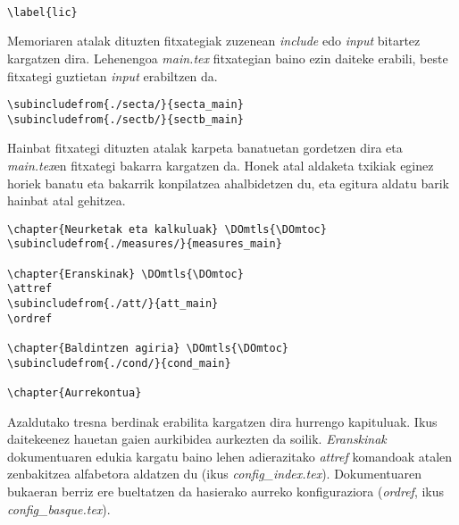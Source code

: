 \begin{verbatim}

\label{lic}

\end{verbatim}

Memoriaren atalak dituzten fitxategiak zuzenean \emph{include} edo \emph{input} bitartez kargatzen dira. Lehenengoa \emph{main.tex} fitxategian baino ezin daiteke erabili, beste fitxategi guztietan \emph{input} erabiltzen da.

\begin{verbatim}
\subincludefrom{./secta/}{secta_main}
\subincludefrom{./sectb/}{sectb_main}
\end{verbatim}

Hainbat fitxategi dituzten atalak karpeta banatuetan gordetzen dira eta \emph{main.tex}en fitxategi bakarra kargatzen da. Honek atal aldaketa txikiak eginez horiek banatu eta bakarrik konpilatzea ahalbidetzen du, eta egitura aldatu barik hainbat atal gehitzea.

\begin{verbatim}
\chapter{Neurketak eta kalkuluak} \DOmtls{\DOmtoc}
\subincludefrom{./measures/}{measures_main}

\chapter{Eranskinak} \DOmtls{\DOmtoc}
\attref
\subincludefrom{./att/}{att_main}
\ordref

\chapter{Baldintzen agiria} \DOmtls{\DOmtoc}
\subincludefrom{./cond/}{cond_main}

\chapter{Aurrekontua}
\end{verbatim}

Azaldutako tresna berdinak erabilita kargatzen dira hurrengo kapituluak. Ikus daitekeenez hauetan gaien aurkibidea aurkezten da soilik. \emph{Eranskinak} dokumentuaren edukia kargatu baino lehen adierazitako \emph{attref} komandoak atalen zenbakitzea alfabetora aldatzen du (ikus \emph{config\_index.tex}). Dokumentuaren bukaeran berriz ere bueltatzen da hasierako aurreko konfiguraziora (\emph{ordref}, ikus \emph{config\_basque.tex}).

